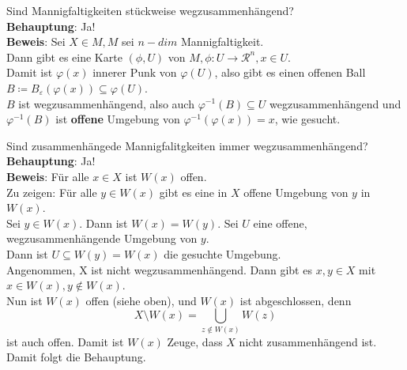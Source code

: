 \begin{problem*}[4a]
Sind Mannigfaltigkeiten stückweise wegzusammenhängend?\\
\textbf{Behauptung}: Ja! \\
\textbf{Beweis}: Sei $ X \in M, M $ sei $ n-dim $ Mannigfaltigkeit. \\
Dann gibt es eine Karte $(\phi, U) $ von $ M, \phi: U \to  \mathcal{R}^n, x \in U$.\\
Damit ist $ \varphi(x) $ innerer Punk von $ \varphi(U)$, also gibt es einen offenen Ball \\ $B \coloneqq B_\varepsilon(\varphi(x)) \subseteq \varphi(U)$.\\
$ B $ ist wegzusammenhängend, also auch $\varphi^{-1}(B) \subseteq U$ wegzusammenhängend und $\varphi^{-1}(B)$ ist \textbf{offene} Umgebung von $\varphi^{-1}(\varphi(x)) = x$, wie gesucht.
\end{problem*}

\begin{problem*}[4b]
Sind zusammenhängede Mannigfalitgkeiten immer wegzusammenhängend?\\
\textbf{Behauptung}: Ja!\\
\textbf{Beweis}: Für alle $ x \in X$ ist $ W(x) $ offen.\\
Zu zeigen: Für alle $ y \in W(x)$ gibt es eine in $ X $ offene Umgebung von $ y $ in $ W(x) $.\\
Sei $ y \in W(x)$. Dann ist $ W(x) = W(y)$. Sei $ U $ eine offene, wegzusammenhängende Umgebung von $ y $.\\
Dann ist $ U \subseteq W(y) = W(x)$ die gesuchte Umgebung.\\
Angenommen, X ist nicht wegzusammenhängend. Dann gibt es $ x,y \in X $ mit $x \in W(x), y \notin W(x)$. \\
Nun ist $W(x)$ offen (siehe oben), und $ W(x) $ ist abgeschlossen, denn
\begin{equation*}
	X \setminus W(x) = \bigcup_{ z \notin W(x)} W(z)
\end{equation*}
ist auch offen. Damit ist $ W(x) $ Zeuge, dass $ X $ nicht zusammenhängend ist. Damit folgt die Behauptung.\\
\end{problem*}

















